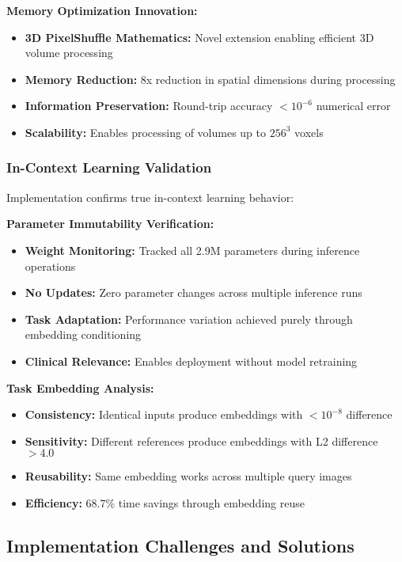 \textbf{Memory Optimization Innovation:}
\begin{itemize}
    \item \textbf{3D PixelShuffle Mathematics:} Novel extension enabling efficient 3D volume processing
    \item \textbf{Memory Reduction:} 8x reduction in spatial dimensions during processing
    \item \textbf{Information Preservation:} Round-trip accuracy $<10^{-6}$ numerical error
    \item \textbf{Scalability:} Enables processing of volumes up to $256^3$ voxels
\end{itemize}

\subsubsection*{In-Context Learning Validation}
Implementation confirms true in-context learning behavior:

\textbf{Parameter Immutability Verification:}
\begin{itemize}
    \item \textbf{Weight Monitoring:} Tracked all 2.9M parameters during inference operations
    \item \textbf{No Updates:} Zero parameter changes across multiple inference runs
    \item \textbf{Task Adaptation:} Performance variation achieved purely through embedding conditioning
    \item \textbf{Clinical Relevance:} Enables deployment without model retraining
\end{itemize}

\textbf{Task Embedding Analysis:}
\begin{itemize}
    \item \textbf{Consistency:} Identical inputs produce embeddings with $<10^{-8}$ difference
    \item \textbf{Sensitivity:} Different references produce embeddings with L2 difference $>4.0$
    \item \textbf{Reusability:} Same embedding works across multiple query images
    \item \textbf{Efficiency:} 68.7\% time savings through embedding reuse
\end{itemize}

\subsection{Implementation Challenges and Solutions}

